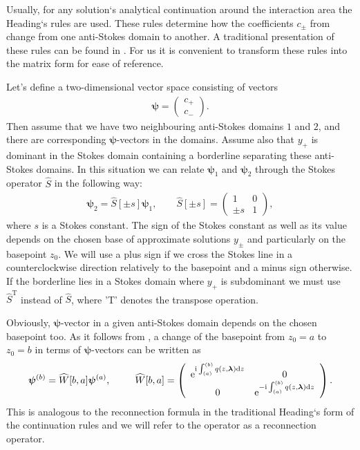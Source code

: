 \documentclass[12pt]{iopart}
\def\S{\widehat{S}}
\def\W{\widehat{W}}
\def\psii{\bm\psi}
\def\lmbd{\bm{\lambda}}
\def\Tp{\mathrm{T}}
\newcommand\phsintgrnd[1][z]{q(#1,\lmbd)}
\newcommand\phsintgrl[3][z]{\int_{#2}^{#3} \phsintgrnd[#1] \rmd #1}
\begin{document}
Usually, for any solution`s analytical continuation around the interaction area 
the Heading`s rules are used. These rules determine how the coefficients $c_\pm$ 
from  change from one anti-Stokes domain to another. A traditional presentation 
of these rules can be found in \cite{heading, white}. For us it is convenient to transform 
these rules into the matrix form for ease of reference.

Let's define a two-dimensional vector space consisting of vectors
\begin{eqnarray}
\psii= \left(\begin{array}{*{2}{c}} c_+ \\ c_- \end{array}\right).
\end{eqnarray}
Then assume that we have two neighbouring anti-Stokes domains $1$ and $2$, and there are 
corresponding $\psii$-vectors in the domains. Assume also that $y_+$ is dominant in the Stokes 
domain containing a borderline separating these anti-Stokes domains. 
In this situation we can relate $\psii_1$ and $\psii_2$ through the Stokes 
operator $\S$ in the following way:
\begin{eqnarray}
\psii_2 = \S[\pm s] \psii_1, \qquad 
\S[\pm s] = \left(\begin{array}{*{2}{c}} 1 & 0 \\ \pm s & 1 \end{array}\right),    
\end{eqnarray}
where $s$ is a Stokes constant. The sign of the Stokes constant as well as its value 
depends on the chosen base of approximate solutions $y_\pm$ and particularly on the 
basepoint $z_0$. We will use a plus sign if we cross the Stokes line in a counterclockwise 
direction relatively to the basepoint and a minus sign otherwise. If the borderline lies in 
a Stokes domain where $y_+$ is subdominant we must use $\S^{\Tp}$ instead of $\S$, where 'T' 
denotes the transpose operation.

Obviously, $\psii$-vector in a given anti-Stokes domain depends on the chosen basepoint too. 
As it follows from , a change of the basepoint from $z_0=a$ to $z_0=b$ in 
terms of $\psii$-vectors can be written as
\begin{eqnarray}
\psii^{(b)} = \W[b,a] \psii^{(a)}, \qquad 
\W[b,a] =  
\left(\begin{array}{*{2}{c}}
\rme^{\rmi \phsintgrl{(a)}{(b)}} & 0 \\ 0 & \rme^{-\rmi \phsintgrl{(a)}{(b)}} 
\end{array}\right).
\end{eqnarray}
This is analogous to the reconnection formula in the traditional Heading`s form of the continuation 
rules and we will refer to the operator as a reconnection operator.
\end{document}
